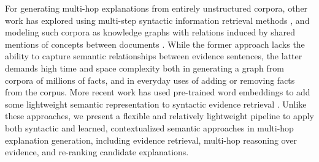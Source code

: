 \documentclass[letterpaper]{article} %
\begin{document}
For generating multi-hop explanations from entirely unstructured corpora, other work has explored using multi-step syntactic information retrieval methods \cite{jhamtani-clark-2020-learning}, and modeling such corpora as knowledge graphs with relations induced by shared mentions of concepts between documents \cite{dhingra2020differentiable,lin-etal-2021-differentiable}. While the former approach lacks the ability to capture semantic relationships between evidence sentences, the latter demands high time and space complexity both in generating a graph from corpora of millions of facts, and in everyday uses of adding or removing facts from the corpus. 
More recent work has used pre-trained word embeddings to add some lightweight semantic representation to syntactic evidence retrieval \cite{yadav-etal-2021-want}.
Unlike these approaches, we present a flexible and relatively lightweight pipeline to apply both syntactic and learned, contextualized semantic approaches in multi-hop explanation generation, including evidence retrieval, multi-hop reasoning over evidence, and re-ranking candidate explanations.



\end{document}
